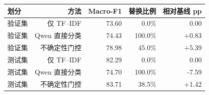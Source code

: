 \begin{tabular}{lrrrr}
\toprule
划分 & 方法 & Macro-F1 & 替换比例 & 相对基线 pp\\
\midrule
验证集 & 仅 TF--IDF & 73.60 & 0.0\% & 0.00\\
验证集 & Qwen 直接分类 & 74.43 & 100.0\% & +0.83\\
验证集 & 不确定性门控 & 78.98 & 45.0\% & +5.39\\
\addlinespace
测试集 & 仅 TF--IDF & 82.29 & 0.0\% & 0.00\\
测试集 & Qwen 直接分类 & 74.70 & 100.0\% & -7.59\\
测试集 & 不确定性门控 & 83.71 & 38.5\% & +1.42\\
\bottomrule
\end{tabular}
